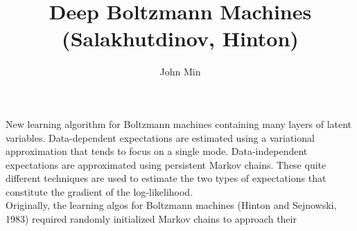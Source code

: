 \documentclass{article}
\author{John Min}
\title{Deep Boltzmann Machines (Salakhutdinov, Hinton)}
\begin{document}
\maketitle

New learning algorithm for Boltzmann machines containing many layers of latent variables.  Data-dependent expectations are estimated using a variational approximation that tends to focus on a single mode.  Data-independent expectations are approximated using persistent Markov chains.  These quite different techniques are used to estimate the two types of expectations that constitute the gradient of the log-likelihood. \\


\noindent
Originally, the learning algos for Boltzmann machines (Hinton and Sejnowski, 1983) required randomly initialized Markov chains to approach their 
\end{document}
